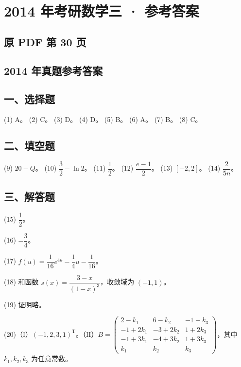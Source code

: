 \documentclass[UTF8,12pt]{ctexart}
\begin{document}
\section*{2014 年考研数学三 · 参考答案}
\subsection*{原 PDF 第 30 页}

\subsection*{2014 年真题参考答案}

\subsection*{一、选择题}

(1) A。 (2) C。 (3) D。 (4) D。 (5) B。 (6) A。 (7) B。 (8) C。


\subsection*{二、填空题}

(9) \(\displaystyle 20-Q\)。 (10) \(\displaystyle \dfrac{\displaystyle 3}{\displaystyle 2}-\ln2\)。 (11) \(\displaystyle \dfrac{\displaystyle 1}{\displaystyle 2}\)。 (12) \(\displaystyle \dfrac{\displaystyle e-1}{\displaystyle 2}\)。 (13) \(\displaystyle [-2,\allowbreak 2]\)。 (14) \(\displaystyle \dfrac{\displaystyle 2}{\displaystyle 5n}\)。


\subsection*{三、解答题}

(15) \(\displaystyle \dfrac{\displaystyle 1}{\displaystyle 2}\)。


(16) \(\displaystyle -\dfrac{\displaystyle 3}{\displaystyle 4}\)。


(17) \(\displaystyle f(u)=\dfrac{\displaystyle 1}{\displaystyle 16}e^{4u}-\dfrac{\displaystyle 1}{\displaystyle 4}u-\dfrac{\displaystyle 1}{\displaystyle 16}\)。


(18) 和函数 \(\displaystyle s(x)=\dfrac{\displaystyle 3-x}{\displaystyle (1-x)^3}\)，收敛域为 \(\displaystyle (-1,\allowbreak 1)\)。


(19) 证明略。


(20)（I）\(\displaystyle (-1,\allowbreak 2,\allowbreak 3,\allowbreak 1)^{\mathrm T}\)。（II）\(\displaystyle B=\begin{pmatrix}2-k_1&6-k_2&-1-k_3\\-1+2k_1&-3+2k_2&1+2k_3\\-1+3k_1&-4+3k_2&1+3k_3\\k_1&k_2&k_3\end{pmatrix}\)，其中 \(\displaystyle k_1,\allowbreak k_2,\allowbreak k_3\) 为任意常数。
\end{document}
